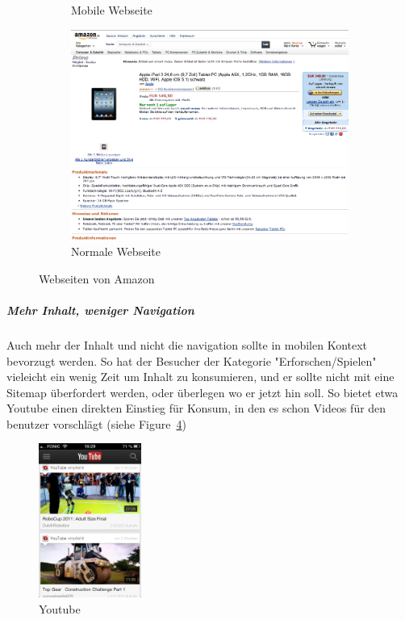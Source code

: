 \begin{figure}
\begin{subfigure}[b]{0.3\textwidth}
		\caption{Mobile Webseite}\label{fig:amazon}
	\end{subfigure}
	\begin{subfigure}[b]{0.6\textwidth}
		\centering
		\includegraphics[width=1\textwidth]{img/amazonFull.png}
		\caption{Normale Webseite}\label{fig:amazonFull}
	\end{subfigure}
	\caption{Webseiten von Amazon}\label{fig:amazonSites}
\end{figure}

\subparagraph{Mehr Inhalt, weniger Navigation} 
\label{subp:entferne_das_fett} 

Auch mehr der Inhalt und nicht die navigation sollte in mobilen Kontext bevorzugt werden\cite[Seite 52]{mobileFirst}. So hat der Besucher der Kategorie "Erforschen/Spielen" vieleicht ein wenig Zeit um Inhalt zu konsumieren, und er sollte nicht mit eine Sitemap überfordert werden, oder überlegen wo er jetzt hin soll. So bietet etwa Youtube einen direkten Einstieg für Konsum, in den es schon Videos für den benutzer vorschlägt (siehe Figure~\ref{fig:youtube})

\begin{figure}
	\begin{center}
	\includegraphics[width=0.3\textwidth]{img/youtube.png}
	\caption{Youtube}\label{fig:youtube}
\end{center}
\end{figure}


